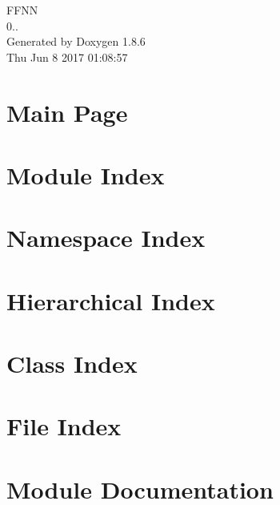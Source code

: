 \documentclass[twoside]{book}
\newcommand{\clearemptydoublepage}{%
  \newpage{\pagestyle{empty}\cleardoublepage}%
}
\begin{document}
\hypersetup{pageanchor=false}
\begin{titlepage}
\vspace*{7cm}
\begin{center}%
{\Large F\-F\-N\-N \\[1ex]\large 0.. }\\
\vspace*{1cm}
{\large Generated by Doxygen 1.8.6}\\
\vspace*{0.5cm}
{\small Thu Jun 8 2017 01:08:57}\\
\end{center}
\end{titlepage}
\clearemptydoublepage
\tableofcontents
\clearemptydoublepage
{}
\hypersetup{pageanchor=true}

\chapter{Main Page}
\label{index}\hypertarget{index}{}
\chapter{Module Index}

\chapter{Namespace Index}

\chapter{Hierarchical Index}

\chapter{Class Index}

\chapter{File Index}

\chapter{Module Documentation}

\end{document}
